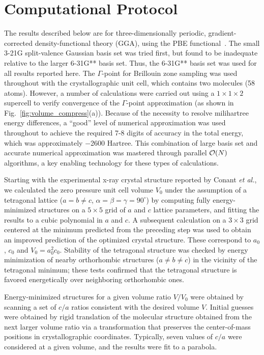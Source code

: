 \documentclass[prb,aps,nobibnotes,twocolumn,doublespace,twocolumngrid,superbib]{revtex4}
\begin{document}
\section{Computational Protocol}
\label{sec:protocol}
The results described below are for three-dimensionally periodic,
gradient-corrected density-functional theory (GGA), using the PBE
functional~\cite{Perdew_96v77}. The small 3-21G split-valence Gaussian 
basis set was tried first, but found to be inadequate relative to the
larger 6-31G** basis set.  Thus, the 6-31G** basis set was used
for all results reported here. The $\Gamma$-point for Brillouin zone sampling was 
used throughout with the crystallographic unit 
cell, which contains two molecules (58 atoms).  However, a number of calculations 
were carried out using a $1 \times 1 \times 2 $ supercell to verify 
convergence of the $\Gamma$-point approximation (as shown in 
Fig.~\ref{fig:volume_compress}(a)).  
Because of the necessity to resolve milihartree energy differences,
a ``good'' level of numerical approximation was used throughout to
achieve the required 7-8 digits of accuracy in the total energy,
which was approximately $-$2600 Hartree.
This combination of large basis set and accurate numerical
approximation was mastered through parallel ${\cal O}(N)$ algorithms, a 
key enabling technology for these types of calculations. 

Starting with the experimental x-ray crystal structure reported by
Conant {\it et al.},~\cite{Conant_1979} we calculated the zero
pressure unit cell volume $V_0$ under the assumption of a tetragonal
lattice ($a=b\neq c$, $\alpha=\beta=\gamma=90^\circ$) by computing
fully energy-minimized structures on a $5\times 5$ grid of $a$ and $c$
lattice parameters, and fitting the results to a cubic polynomial in
$a$ and $c$.  A subsequent calculation on a $3 \times 3$ grid centered
at the minimum predicted from the preceding step was used to obtain an
improved prediction of the optimized crystal structure.  These
correspond to $a_0$, $c_0$ and $V_0=a_0^2c_0$.  Stability of the 
tetragonal structure was checked by energy minimization of nearby
orthorhombic structures ($a\neq b\neq c$) in the vicinity of the tetragonal 
minimum; these tests confirmed that the tetragonal structure is favored 
energetically over neighboring orthorhombic ones.

Energy-minimized structures for a given volume ratio $V/V_0$ were
obtained by scanning a set of $c/a$ ratios consistent with the desired
volume $V$.  Initial guesses were obtained by rigid translation of the
molecular structure obtained from the next larger volume ratio via a
transformation that preserves the center-of-mass positions in
crystallographic coordinates.  Typically, seven values of $c/a$ were
considered at a given volume, and the results were fit to a parabola.
\end{document}
